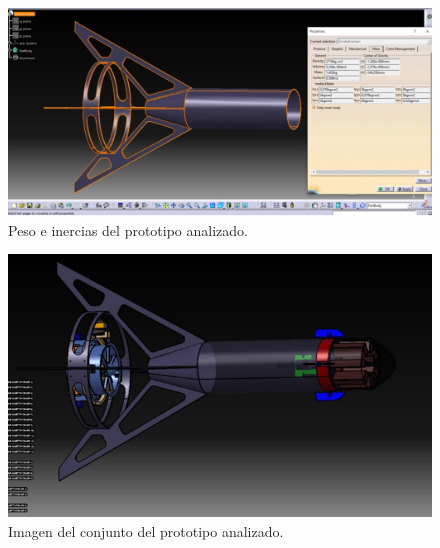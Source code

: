 \begin{figure}[htb]
    \centering
    \includegraphics[width=\linewidth]{fig/fea/inerciaspatas.png}
    \caption{Peso e inercias del prototipo analizado.}
    \label{fig:fea/patas4}
\end{figure}

\begin{figure}[htb]
    \centering
    \includegraphics[width=\linewidth]{fig/fea/imagenpatas.png}
    \caption{Imagen del conjunto del prototipo analizado.}
    \label{fig:fea/imagenpatas}
\end{figure}


